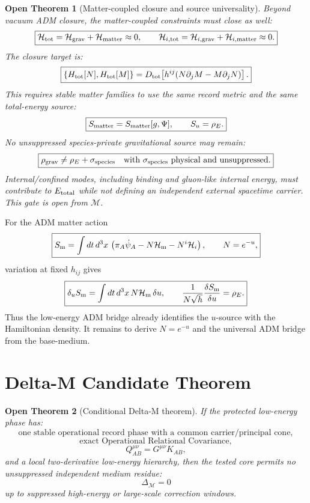 \documentclass[11pt]{article}
\newtheorem{openthm}{Open Theorem}
\begin{document}
\begin{openthm}[Matter-coupled closure and source universality]
Beyond vacuum ADM closure, the matter-coupled constraints must close as well:
\[
\boxed{
\mathcal H_{\rm tot}
=
\mathcal H_{\rm grav}
+
\mathcal H_{\rm matter}
\approx0,
\qquad
\mathcal H_{i,\rm tot}
=
\mathcal H_{i,\rm grav}
+
\mathcal H_{i,\rm matter}
\approx0.
}
\]
The closure target is:
\[
\boxed{
\{H_{\rm tot}[N],H_{\rm tot}[M]\}
=
D_{\rm tot}\!\left[h^{ij}(N\partial_jM-M\partial_jN)\right].
}
\]
This requires stable matter families to use the same record metric and the
same total-energy source:
\[
\boxed{
S_{\rm matter}=S_{\rm matter}[g,\Psi],
\qquad
S_u=\rho_E.
}
\]
No unsuppressed species-private gravitational source may remain:
\[
\boxed{
\rho_{\rm grav}
\neq
\rho_E+\sigma_{\rm species}
\quad
\text{with }\sigma_{\rm species}\text{ physical and unsuppressed}.
}
\]
Internal/confined modes, including binding and gluon-like internal energy,
must contribute to \(E_{\rm total}\) while not defining an independent external
spacetime carrier.  This gate is open from \(\mathcal M\).
\end{openthm}

For the ADM matter action
\[
\boxed{
S_{\rm m}
=
\int dt\,d^3x\,
\left(
\pi_A\dot\psi_A
-N\mathcal H_{\rm m}
-N^i\mathcal H_i
\right),
\qquad
N=e^{-u},
}
\]
variation at fixed \(h_{ij}\) gives
\[
\boxed{
\delta_u S_{\rm m}
=
\int dt\,d^3x\,N\mathcal H_{\rm m}\,\delta u,
\qquad
\frac{1}{N\sqrt h}\frac{\delta S_{\rm m}}{\delta u}
=
\rho_E.
}
\]
Thus the low-energy ADM bridge already identifies the \(u\)-source with the
Hamiltonian density.  It remains to derive \(N=e^{-u}\) and the universal ADM
bridge from the base-medium.

\section{Delta-M Candidate Theorem}

\begin{openthm}[Conditional Delta-M theorem]
If the protected low-energy phase has:
\[
\boxed{
\text{one stable operational record phase with a common carrier/principal cone},
}
\]
\[
\boxed{
\text{exact Operational Relational Covariance},
}
\]
\[
\boxed{
Q_{AB}^{\mu\nu}=G^{\mu\nu}K_{AB},
}
\]
and a local two-derivative low-energy hierarchy, then the tested core permits no
unsuppressed independent medium residue:
\[
\boxed{
\Delta_{\mathcal M}=0
}
\]
up to suppressed high-energy or large-scale correction windows.
\end{openthm}
\end{document}
